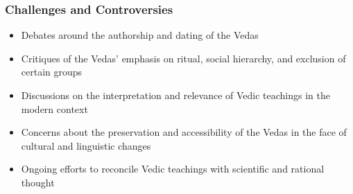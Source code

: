 \begin{frame}[fragile]\frametitle{Challenges and Controversies}
    \begin{itemize}
        \item Debates around the authorship and dating of the Vedas
        \item Critiques of the Vedas' emphasis on ritual, social hierarchy, and exclusion of certain groups
        \item Discussions on the interpretation and relevance of Vedic teachings in the modern context
        \item Concerns about the preservation and accessibility of the Vedas in the face of cultural and linguistic changes
        \item Ongoing efforts to reconcile Vedic teachings with scientific and rational thought
    \end{itemize}
\end{frame}
